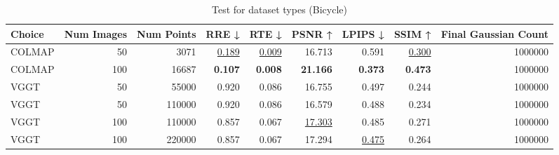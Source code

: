 \begin{table}[H]
\caption{Test for dataset types (Bicycle)}
\label{tab:99_dataset_type_bicycle}
\begin{tabular}{lrrrrrrrr}
\toprule
Choice & Num Images & Num Points & RRE ↓ & RTE ↓ & PSNR ↑ & LPIPS ↓ & SSIM ↑ & Final Gaussian Count \\
\midrule
COLMAP & 50 & 3071 & \underline{0.189} & \underline{0.009} & 16.713 & 0.591 & \underline{0.300} & 1000000 \\
COLMAP & 100 & 16687 & \textbf{0.107} & \textbf{0.008} & \textbf{21.166} & \textbf{0.373} & \textbf{0.473} & 1000000 \\
VGGT & 50 & 55000 & 0.920 & 0.086 & 16.755 & 0.497 & 0.244 & 1000000 \\
VGGT & 50 & 110000 & 0.920 & 0.086 & 16.579 & 0.488 & 0.234 & 1000000 \\
VGGT & 100 & 110000 & 0.857 & 0.067 & \underline{17.303} & 0.485 & 0.271 & 1000000 \\
VGGT & 100 & 220000 & 0.857 & 0.067 & 17.294 & \underline{0.475} & 0.264 & 1000000 \\
\bottomrule
\end{tabular}
\end{table}
